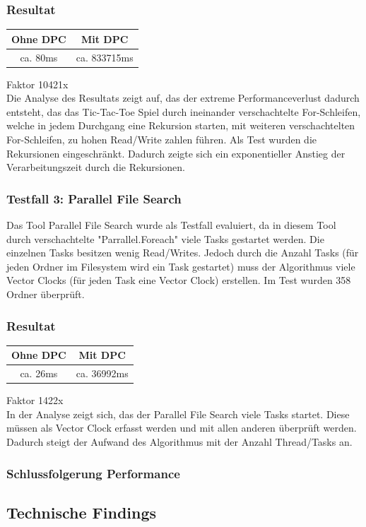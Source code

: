 \documentclass[10pt,a4paper]{article}
\begin{document}
\begin{flushleft}
\subsubsection*{Resultat}
 \begin{tabular}{|c|c|}
\hline 
Ohne DPC & Mit DPC \\ 
\hline 
ca. 80ms & ca. 833715ms \\ 
\hline 
\end{tabular} 
Faktor 10421x\\[0.4cm]
Die Analyse des Resultats zeigt auf, das der extreme Performanceverlust dadurch entsteht, das das Tic-Tac-Toe Spiel durch ineinander verschachtelte For-Schleifen, welche in jedem Durchgang eine Rekursion starten, mit weiteren verschachtelten For-Schleifen, zu hohen Read/Write zahlen führen. Als Test wurden die Rekursionen eingeschränkt. Dadurch zeigte sich ein exponentieller Anstieg der Verarbeitungszeit durch die Rekursionen.
\subsubsection*{Testfall 3: Parallel File Search}
Das Tool Parallel File Search wurde als Testfall evaluiert, da in diesem Tool durch verschachtelte "Parrallel.Foreach" viele Tasks gestartet werden. Die einzelnen Tasks besitzen wenig Read/Writes. Jedoch durch die Anzahl Tasks (für jeden Ordner im Filesystem wird ein Task gestartet) muss der Algorithmus viele Vector Clocks (für jeden Task eine Vector Clock) erstellen. Im Test wurden 358 Ordner überprüft.
\subsubsection*{Resultat}
\begin{tabular}{|c|c|}
\hline 
Ohne DPC & Mit DPC \\ 
\hline 
ca. 26ms & ca. 36992ms \\ 
\hline 
\end{tabular} 
Faktor 1422x\\[0.4cm]
In der Analyse zeigt sich, das der Parallel File Search viele Tasks startet. Diese müssen als Vector Clock erfasst werden und mit allen anderen überprüft werden. Dadurch steigt der Aufwand des Algorithmus mit der Anzahl Thread/Tasks an.
\end{flushleft}
\subsubsection{Schlussfolgerung Performance}
\subsection{Technische Findings}
\end{document}

